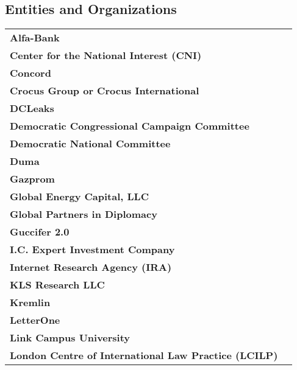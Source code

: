 
\subsection{Entities and Organizations}

\begin{tabu} to \textwidth {XX[3]}

    \textbf{Alfa-Bank} &  \\

    \textbf{Center for the National Interest (CNI)} &  \\

    \textbf{Concord} &  \\

    \textbf{Crocus Group or Crocus International} &  \\

    \textbf{DCLeaks} &  \\

    \textbf{Democratic Congressional Campaign Committee} &  \\

    \textbf{Democratic National Committee} &  \\

    \textbf{Duma} &  \\

    \textbf{Gazprom} &  \\

    \textbf{Global Energy Capital, LLC} &  \\

    \textbf{Global Partners in Diplomacy} &  \\

    \textbf{Guccifer 2.0} &  \\

    \textbf{I.C. Expert Investment Company} &  \\

    \textbf{Internet Research Agency (IRA)} &  \\

    \textbf{KLS Research LLC} &  \\

    \textbf{Kremlin} &  \\

    \textbf{LetterOne} &  \\

    \textbf{Link Campus University} &  \\

    \textbf{London Centre of International Law Practice (LCILP)} &  \\


\end{tabu}

